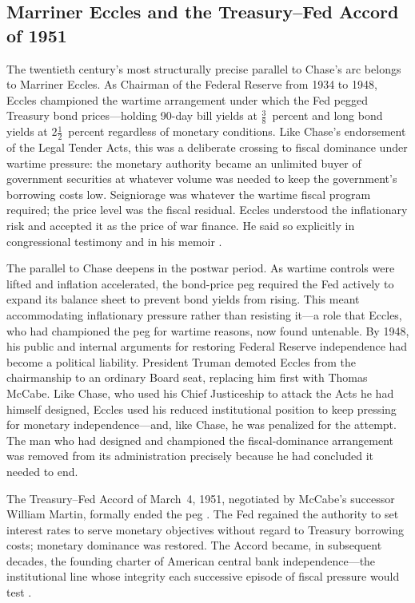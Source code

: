 \documentclass[12pt]{article}
\begin{document}
\subsection{Marriner Eccles and the Treasury--Fed Accord of 1951}

The twentieth century's most structurally precise parallel to Chase's arc
belongs to Marriner Eccles.  As Chairman of the Federal Reserve from 1934
to 1948, Eccles championed the wartime arrangement under which the Fed
pegged Treasury bond prices---holding 90-day bill yields at
$\tfrac{3}{8}$~percent and long bond yields at $2\tfrac{1}{2}$~percent
regardless of monetary conditions.  Like Chase's endorsement of the Legal
Tender Acts, this was a deliberate crossing to fiscal dominance under
wartime pressure: the monetary authority became an unlimited buyer of
government securities at whatever volume was needed to keep the
government's borrowing costs low.  Seigniorage was whatever the wartime
fiscal program required; the price level was the fiscal residual.  Eccles
understood the inflationary risk and accepted it as the price of war
finance.  He said so explicitly in congressional testimony and in his
memoir \citep{Eccles1951}.

The parallel to Chase deepens in the postwar period.  As wartime controls
were lifted and inflation accelerated, the bond-price peg required the
Fed actively to expand its balance sheet to prevent bond yields from
rising.  This meant accommodating inflationary pressure rather than
resisting it---a role that Eccles, who had championed the peg for wartime
reasons, now found untenable.  By 1948, his public and internal arguments
for restoring Federal Reserve independence had become a political
liability.  President Truman demoted Eccles from the chairmanship to an
ordinary Board seat, replacing him first with Thomas McCabe.  Like Chase,
who used his Chief Justiceship to attack the Acts he had himself designed,
Eccles used his reduced institutional position to keep pressing for
monetary independence---and, like Chase, he was penalized for the attempt.
The man who had designed and championed the fiscal-dominance arrangement
was removed from its administration precisely because he had concluded it
needed to end.

The Treasury--Fed Accord of March~4, 1951, negotiated by McCabe's
successor William Martin, formally ended the peg \citep{HetzelLeach2001}.
The Fed regained the authority to set interest rates to serve monetary
objectives without regard to Treasury borrowing costs; monetary dominance
was restored.  The Accord became, in subsequent decades, the founding
charter of American central bank independence---the institutional line
whose integrity each successive episode of fiscal pressure would test
\citep{Meltzer2003}.
\end{document}
